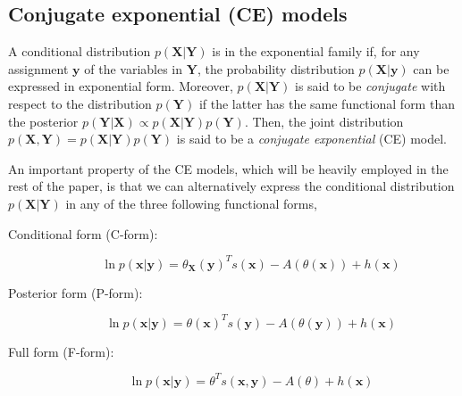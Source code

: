 \documentclass[11pt, oneside]{article}   	%
\newcommand{\bm}{\mathbf}
\numberwithin{figure}{section}
\numberwithin{equation}{section}
\numberwithin{table}{section}
\theoremstyle{definition}
\begin{document}
\subsection*{Conjugate exponential (CE) models} \label{sec:CondDist}

A conditional distribution $p(\bm X | \bm Y)$ is  in the exponential family if, for any assignment $\bm y$ of the variables in $\bm Y$, the probability distribution $p(\bm X|\bm y)$ can be expressed in exponential form. Moreover, $p(\bm X | \bm Y)$ is said to be \textit{conjugate} with respect to the distribution $p(\bm Y)$ if the latter has the same functional form than the posterior $p(\bm Y|\bm X)\propto p(\bm X|\bm Y)p(\bm Y)$. Then, the joint distribution $p(\bm X, \bm Y)= p(\bm X|\bm Y)p(\bm Y)$ is said to be a \textit{conjugate exponential} (CE) model. 


An important property of the CE models, which will be heavily employed in the rest of the paper, is that we can alternatively express the conditional distribution $p(\bm X|\bm Y)$ in any of the three following functional forms, 

\begin{description}

\item[Conditional form (C-form):]
\begin{equation}
\label{Equation:EqCED}
\ln p(\bm x | \bm y) = \theta_{\bm X}(\bm y)^Ts(\bm x) - A(\theta(\bm x)) + h(\bm x) 
\end{equation}

\item[Posterior form (P-form):]
\begin{equation}
\label{Equation:EqCED}
\ln p(\bm x | \bm y) = \theta(\bm x)^Ts(\bm y) - A(\theta(\bm y)) + h(\bm x) 
\end{equation}

\item[Full form (F-form):]
\begin{equation}
\label{Equation:EqCED}
\ln p(\bm x | \bm y) = \theta^Ts(\bm x,\bm y) - A(\theta) + h(\bm x) 
\end{equation}

\end{description}
 
\end{document}

